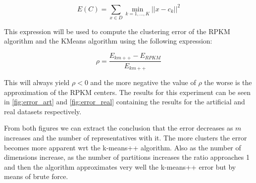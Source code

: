 $$E(C) = \sum_{x \in D} \min_{k=1,\dots,K}||x-c_k||^2$$

This expression will be used to compute the clustering error of the RPKM algorithm and the KMeans algorithm using the following expression:

$$\rho = \frac{E_{km++} - E_{RPKM}}{E_{km++}}$$

This will always yield $\rho < 0$ and the more negative the value of $\rho$ the worse is the approximation of the RPKM centers. The results for this experiment can be seen in \ref{fig:error_art} and \ref{fig:error_real} containing the results for the artificial and real datasets respectively.

From both figures we can extract the conclusion that the error decreases as $m$ increases and the number of representatives with it. The more clusters the error becomes more apparent wrt the k-means++ algorithm. Also as the number of dimensions increase, as the number of partitions increases the ratio approaches 1 and then the algorithm approximates very well the k-means++ error but by means of brute force.

